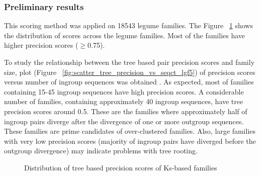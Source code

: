 \documentclass{article}
\begin{document}
		\subsubsection{Preliminary results}
		This scoring method was applied on 18543 legume families. The Figure ~\ref{fig:hist_tree_precision_scores_lgf5} shows the distribution of scores across the legume families. Most of the families have higher precision scores ($\geq$0.75).
		
		To study the relationship between the tree based pair precision scores and family size, plot (Figure ~\ref{fig:scatter_tree_precision_vs_seqct_lgf5}) of precision scores versus number of ingroup sequences was obtained . As expected, most of families containing 15-45 ingroup sequences  have high precision scores. A considerable number of families, containing approximately 40 ingroup sequences, have tree precision scores around 0.5. These are the families where approximately half of ingroup pairs diverge after the divergence of one or more outgroup sequences. These families are prime candidates of over-clustered families. Also, large families with very low precision scores (majority of ingroup pairs have diverged before the outgroup divergence) may indicate problems with tree rooting.
		
		
		\begin{figure}[h!]
			\caption{Distribution of tree based precision scores of Ks-based families}
			\label{fig:hist_tree_precision_scores_lgf5}
		\end{figure}
		
\end{document}
